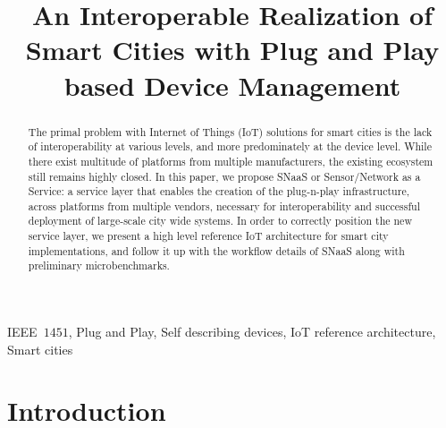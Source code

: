 \documentclass[conference]{IEEEtran}
\begin{document}
\title{An Interoperable Realization of Smart Cities with Plug and Play based Device Management}
\author{
}

\maketitle
\begin{abstract}
The primal problem with Internet of Things (IoT) solutions for smart cities is the lack of interoperability at various levels, and more predominately at the device level.
While there exist multitude of platforms from multiple manufacturers, the existing ecosystem still remains highly closed.
In this paper, we propose SNaaS or Sensor/Network as a Service: a service layer that enables the creation of the plug-n-play infrastructure, across platforms from multiple vendors, necessary for interoperability and successful deployment of large-scale city wide systems.
In order to correctly position the new service layer, we present a high level reference IoT architecture for smart city implementations, and follow it up with the workflow details of SNaaS along with preliminary microbenchmarks.
\end{abstract}

\begin{IEEEkeywords}
IEEE~$1451$, Plug and Play, Self describing devices, IoT reference architecture, Smart cities
\end{IEEEkeywords}

\section{Introduction}
\end{document}
